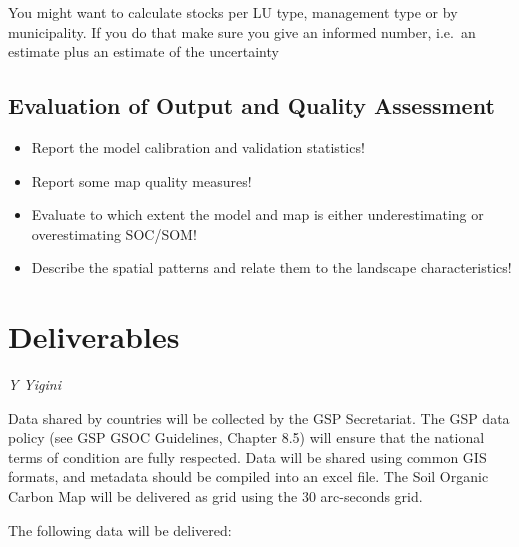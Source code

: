 \documentclass[10pt,b5paper,]{book}
\providecommand{\tightlist}{%
  \setlength{\itemsep}{0pt}\setlength{\parskip}{0pt}}
\theoremstyle{definition}
\theoremstyle{definition}
\theoremstyle{definition}
\theoremstyle{remark}
\begin{document}
You might want to calculate stocks per LU type, management type or by
municipality. If you do that make sure you give an informed number,
i.e.~an estimate plus an estimate of the uncertainty

\hypertarget{evaluation-of-output-and-quality-assessment}{%
\section{Evaluation of Output and Quality
Assessment}\label{evaluation-of-output-and-quality-assessment}}

\begin{itemize}
\tightlist
\item
  Report the model calibration and validation statistics!
\item
  Report some map quality measures!
\item
  Evaluate to which extent the model and map is either underestimating
  or overestimating SOC/SOM!
\item
  Describe the spatial patterns and relate them to the landscape
  characteristics!
\end{itemize}

\hypertarget{deliverables}{%
\chapter{Deliverables}\label{deliverables}}

\emph{Y Yigini}

Data shared by countries will be collected by the GSP Secretariat. The
GSP data policy (see GSP GSOC Guidelines, Chapter 8.5) will ensure that
the national terms of condition are fully respected. Data will be shared
using common GIS formats, and metadata should be compiled into an excel
file. The Soil Organic Carbon Map will be delivered as grid using the 30
arc-seconds grid.

The following data will be delivered:
\end{document}
